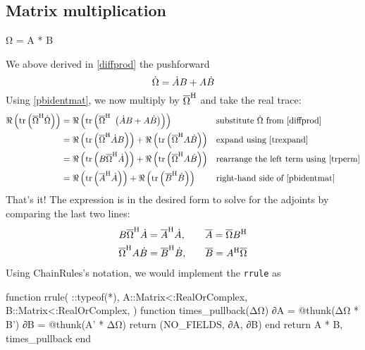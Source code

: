 \documentclass[../main.tex]{subfiles}
\begin{document}
\begin{refsection}
\subsection{Matrix multiplication}\label{matrix-multiplication-1}
\begin{juliacode}
Ω = A * B
\end{juliacode}
We above derived in \eqref{diffprod} the pushforward
\[\dot{\Omega} = \dot{A} B + A \dot{B}\]
Using \eqref{pbidentmat}, we now multiply by ${\overline{\Omega}}^\mathrm{H}$ and take the real trace:
\begin{align*}
\Re\left( \operatorname{tr} \left(
        {\overline{\Omega}}^\mathrm{H} \dot{\Omega}
\right) \right)
    &= \Re\left( \operatorname{tr} \left( {\overline{\Omega}}^\mathrm{H} ~\left(
           \dot{A} B + A \dot{B}
       \right) \right) \right)
           && \text{substitute } \dot{\Omega} \text{ from } \eqref{diffprod}\\
    &= \Re\left( \operatorname{tr} \left(
           {\overline{\Omega}}^\mathrm{H} \dot{A} B
       \right) \right) +
       \Re\left( \operatorname{tr} \left(
           {\overline{\Omega}}^\mathrm{H}  A \dot{B}
       \right) \right)
           && \text{expand using } \eqref{trexpand} \\
    &= \Re\left( \operatorname{tr} \left(
           B {\overline{\Omega}}^\mathrm{H} \dot{A}
       \right) \right) +
       \Re\left( \operatorname{tr} \left(
           {\overline{\Omega}}^\mathrm{H} A \dot{B}
       \right) \right)
           && \text{rearrange the left term using } \eqref{trperm}\\
    &= \Re\left( \operatorname{tr} \left(
           {\overline{A}}^\mathrm{H}  \dot{A}
       \right) \right) +
       \Re\left( \operatorname{tr} \left(
           {\overline{B}}^\mathrm{H} \dot{B}
       \right) \right)
           && \text{right-hand side of } \eqref{pbidentmat}
\end{align*}
That's it!
The expression is in the desired form to solve for the adjoints by comparing the last two lines:
\begin{align*}
B {\overline{\Omega}}^\mathrm{H} \dot{A} &= {\overline{A}}^\mathrm{H}  \dot{A}, \quad
    && \overline{A} = \overline{\Omega} {B}^\mathrm{H}\\
{\overline{\Omega}}^\mathrm{H} A \dot{B} &= {\overline{B}}^\mathrm{H} \dot{B}, \quad
    && \overline{B} = {A}^\mathrm{H} \overline{\Omega}
\end{align*}
Using ChainRules's notation, we would implement the \texttt{rrule} as
\begin{juliacode}
function rrule(
    ::typeof(*),
    A::Matrix{<:RealOrComplex},
    B::Matrix{<:RealOrComplex},
)
    function times_pullback(ΔΩ)
        ∂A = @thunk(ΔΩ * B')
        ∂B = @thunk(A' * ΔΩ)
        return (NO_FIELDS, ∂A, ∂B)
    end
    return A * B, times_pullback
end
\end{juliacode}

\end{refsection}
\end{document}
